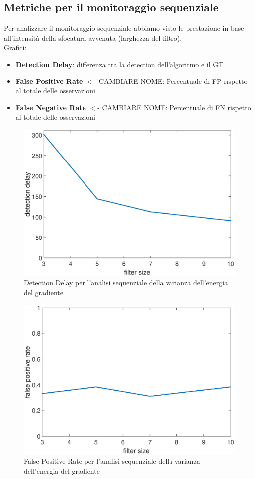\subsection{Metriche per il monitoraggio sequenziale}
Per analizzare il monitoraggio sequenziale abbiamo visto le prestazione in base all'intensit\`a della sfocatura avvenuta (larghezza del filtro).\\
Grafici:
\begin{itemize}
	\item \textbf{Detection Delay}: differenza tra la detection dell'algoritmo e il GT
	\item \textbf{False Positive Rate} $<$- CAMBIARE NOME: Percentuale di FP rispetto al totale delle osservazioni
	\item \textbf{False Negative Rate} $<$- CAMBIARE NOME: Percentuale di FN rispetto al totale delle osservazioni
\end{itemize}
\begin{figure}[tb]
\centering
\includegraphics[width=13cm]{diagrammi/DD}
\caption{Detection Delay per l'analisi sequenziale della varianza dell'energia del gradiente}
\label{fig:DD}
\end{figure}
\begin{figure}[tb]
\centering
\includegraphics[width=13cm]{diagrammi/FPR}
\caption{False Positive Rate per l'analisi sequenziale della varianza dell'energia del gradiente}
\label{fig:FPR}
\end{figure}
